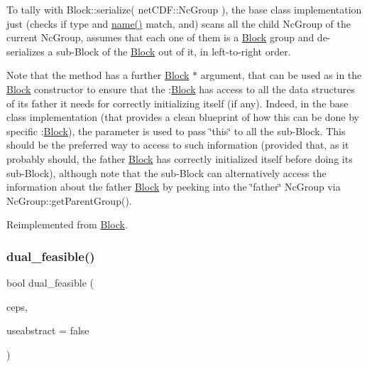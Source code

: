 To tally with Block\+::serialize( net\+C\+D\+F\+::\+Nc\+Group ), the base class implementation just (checks if type and \mbox{\hyperlink{class_s_m_spp__di__unipi__it_1_1_block_a738e9dfd6e00507da219e4bd5a3f6be9}{name()}} match, and) scans all the child Nc\+Group of the current Nc\+Group, assumes that each one of them is a \mbox{\hyperlink{class_s_m_spp__di__unipi__it_1_1_block}{Block}} group and de-\/serializes a sub-\/\+Block of the \mbox{\hyperlink{class_s_m_spp__di__unipi__it_1_1_block}{Block}} out of it, in left-\/to-\/right order.

Note that the method has a further \mbox{\hyperlink{class_s_m_spp__di__unipi__it_1_1_block}{Block}} $\ast$ argument, that can be used as in the \mbox{\hyperlink{class_s_m_spp__di__unipi__it_1_1_block}{Block}} constructor to ensure that the \+:\mbox{\hyperlink{class_s_m_spp__di__unipi__it_1_1_block}{Block}} has access to all the data structures of its father it needs for correctly initializing itself (if any). Indeed, in the base class implementation (that provides a clean blueprint of how this can be done by specific \+:\mbox{\hyperlink{class_s_m_spp__di__unipi__it_1_1_block}{Block}}), the parameter is used to pass \char`\"{}this\char`\"{} to all the sub-\/\+Block. This should be the preferred way to access to such information (provided that, as it probably should, the father \mbox{\hyperlink{class_s_m_spp__di__unipi__it_1_1_block}{Block}} has correctly initialized itself before doing its sub-\/\+Block), although note that the sub-\/\+Block can alternatively access the information about the father \mbox{\hyperlink{class_s_m_spp__di__unipi__it_1_1_block}{Block}} by peeking into the \char`\"{}father\char`\"{} Nc\+Group via Nc\+Group\+::get\+Parent\+Group(). 

Reimplemented from \mbox{\hyperlink{class_s_m_spp__di__unipi__it_1_1_block_a4b98fbc561cffa3e92a2690c831ab3c9}{Block}}.

\mbox{\label{class_s_m_spp__di__unipi__it_1_1_m_c_f_block_a88febf409c7a701c7e3f14045ccde2e7}} 
\subsubsection{\texorpdfstring{dual\+\_\+feasible()}{dual\_feasible()}}
{\footnotesize\ttfamily bool dual\+\_\+feasible (\begin{DoxyParamCaption}\item[{\mbox{\hyperlink{class_s_m_spp__di__unipi__it_1_1_m_c_f_block_a8e47cae4e16e180273d262aae769a854}{c\+\_\+\+C\+Number}}}]{ceps,  }\item[{bool}]{useabstract = {\ttfamily false} }\end{DoxyParamCaption})}



